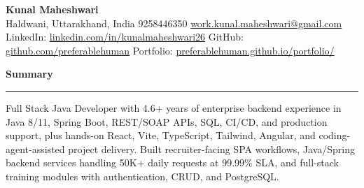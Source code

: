 \documentclass[10pt,letterpaper]{article}
\newcommand{\ressection}[1]{\vspace{2.6pt}\par\textbf{#1}\par\vspace{0.8pt}\hrule\vspace{1.6pt}}
\begin{document}
\pagestyle{empty}\raggedright\fontsize{9.92}{10.68}\selectfont

{\Large \textbf{Kunal Maheshwari}}\\
Haldwani, Uttarakhand, India \textbar{} 9258446350 \textbar{} \href{mailto:work.kunal.maheshwari@gmail.com}{work.kunal.maheshwari@gmail.com}\\
LinkedIn: \href{https://www.linkedin.com/in/kunalmaheshwari26}{linkedin.com/in/kunalmaheshwari26} \textbar{} GitHub: \href{https://github.com/preferablehuman}{github.com/preferablehuman} \textbar{} Portfolio: \href{https://preferablehuman.github.io/portfolio/}{preferablehuman.github.io/portfolio/}

\ressection{Summary}
Full Stack Java Developer with 4.6+ years of enterprise backend experience in Java 8/11, Spring Boot, REST/SOAP APIs, SQL, CI/CD, and production support, plus hands-on React, Vite, TypeScript, Tailwind, Angular, and coding-agent-assisted project delivery. Built recruiter-facing SPA workflows, Java/Spring backend services handling 50K+ daily requests at 99.99\% SLA, and full-stack training modules with authentication, CRUD, and PostgreSQL.
\end{document}
